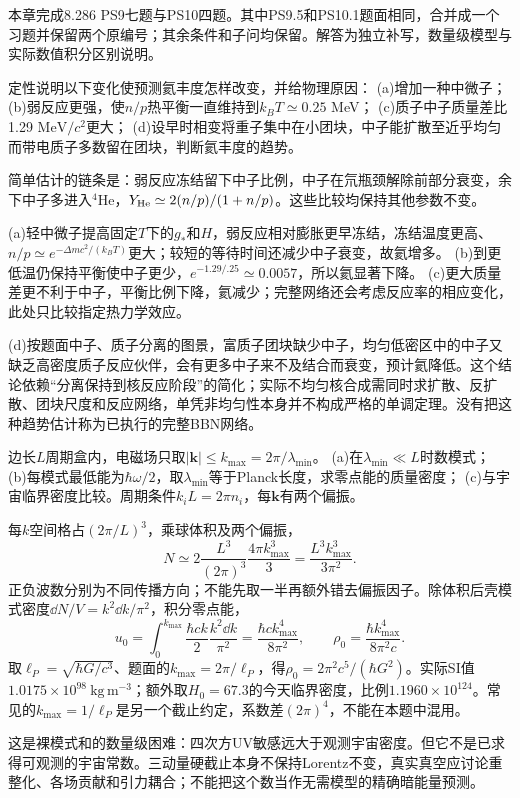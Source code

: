 本章完成8.286 PS9七题与PS10四题。其中PS9.5和PS10.1题面相同，合并成一个习题并保留两个原编号；其余条件和子问均保留。解答为独立补写，数量级模型与实际数值积分区别说明。

\begin{exercise}
定性说明以下变化使预测氦丰度怎样改变，并给物理原因：
(a)增加一种中微子；
(b)弱反应更强，使$n/p$热平衡一直维持到$k_BT\simeq0.25$ MeV；
(c)质子中子质量差比1.29 $\mathrm{MeV}/c^2$更大；
(d)设早时相变将重子集中在小团块，中子能扩散至近乎均匀而带电质子多数留在团块，判断氦丰度的趋势。
\end{exercise}
\begin{solution}
简单估计的链条是：弱反应冻结留下中子比例，中子在氘瓶颈解除前部分衰变，余下中子多进入$^4$He，$Y_{\rm He}\simeq2(n/p)/(1+n/p)$。这些比较均保持其他参数不变。

(a)轻中微子提高固定$T$下的$g_*$和$H$，弱反应相对膨胀更早冻结，冻结温度更高、$n/p\simeq e^{-\Delta m c^2/(k_BT)}$更大；较短的等待时间还减少中子衰变，故氦增多。
(b)到更低温仍保持平衡使中子更少，$e^{-1.29/.25}\simeq0.0057$，所以氦显著下降。
(c)更大质量差更不利于中子，平衡比例下降，氦减少；完整网络还会考虑反应率的相应变化，此处只比较指定热力学效应。

(d)按题面中子、质子分离的图景，富质子团块缺少中子，均匀低密区中的中子又缺乏高密度质子反应伙伴，会有更多中子来不及结合而衰变，预计氦降低。这个结论依赖“分离保持到核反应阶段”的简化；实际不均匀核合成需同时求扩散、反扩散、团块尺度和反应网络，单凭非均匀性本身并不构成严格的单调定理。没有把这种趋势估计称为已执行的完整BBN网络。
\end{solution}

\begin{exercise}
边长$L$周期盒内，电磁场只取$|\boldsymbol k|\le k_{\max}=2\pi/\lambda_{\min}$。
(a)在$\lambda_{\min}\ll L$时数模式；
(b)每模式最低能为$\hbar\omega/2$，取$\lambda_{\min}$等于Planck长度，求零点能的质量密度；
(c)与宇宙临界密度比较。周期条件$k_iL=2\pi n_i$，每$\boldsymbol k$有两个偏振。
\end{exercise}
\begin{solution}
每$k$空间格占$(2\pi/L)^3$，乘球体积及两个偏振，
\[
 N\simeq2\frac{L^3}{(2\pi)^3}\frac{4\pi k_{\max}^3}{3}
 =\frac{L^3k_{\max}^3}{3\pi^2}.
\]
正负波数分别为不同传播方向；不能先取一半再额外错去偏振因子。除体积后壳模式密度$\dd N/V=k^2\dd k/\pi^2$，积分零点能，
\[
 u_0=\int_0^{k_{\max}}\frac{\hbar ck}{2}\frac{k^2\dd k}{\pi^2}
 =\frac{\hbar c k_{\max}^4}{8\pi^2},\qquad
 \rho_0=\frac{\hbar k_{\max}^4}{8\pi^2c}.
\]
取$\ell_P=\sqrt{\hbar G/c^3}$、题面的$k_{\max}=2\pi/\ell_P$，得$\rho_0=2\pi^2c^5/(\hbar G^2)$。实际SI值$1.0175\times10^{98}\ \mathrm{kg\,m^{-3}}$；额外取$H_0=67.3$的今天临界密度，比例$1.1960\times10^{124}$。常见的$k_{\max}=1/\ell_P$是另一个截止约定，系数差$(2\pi)^4$，不能在本题中混用。

这是裸模式和的数量级困难：四次方UV敏感远大于观测宇宙密度。但它不是已求得可观测的宇宙常数。三动量硬截止本身不保持Lorentz不变，真实真空应讨论重整化、各场贡献和引力耦合；不能把这个数当作无需模型的精确暗能量预测。
\end{solution}


